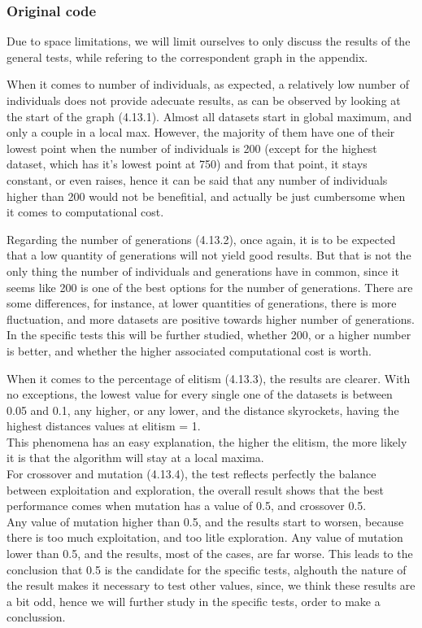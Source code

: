 \subsubsection{Original code}

Due to space limitations, we will limit ourselves to only discuss the results
of the general tests, while refering to the correspondent graph in the
appendix. 

When it comes to number of individuals, as expected, a relatively low number
of individuals does not provide adecuate results, as can be observed by looking
at the start of the graph (4.13.1). Almost all datasets start in global maximum, and only
a couple in a local max. However, the majority of them have one of their
lowest point when the number of individuals is 200 (except for the highest
dataset, which has it's lowest point at 750) and from that point, it stays
constant, or even raises, hence it can be said that any number of individuals higher than 200
would not be benefitial, and actually be just cumbersome when it comes to
computational cost.

Regarding the number of generations (4.13.2), once again, it is to be expected that a
low quantity of generations will not yield good results. But that is not the
only thing the number of individuals and generations have in common, since it
seems like 200 is one of the best options for the number of generations.
There are some differences, for instance, at lower quantities of
generations, there is more fluctuation, and more datasets are positive
towards higher number of generations. In the specific tests this will be
further studied, whether 200, or a higher number is better, and whether the
higher associated computational cost is worth.

When it comes to the percentage of elitism (4.13.3), the results are clearer.
With no exceptions, the lowest value for every single one of the datasets
is between 0.05 and 0.1, any higher, or any lower, and the distance
skyrockets, having the highest distances values at elitism = 1. \\
This phenomena has an easy explanation, the higher the elitism, the more likely it is that the
algorithm will stay at a local maxima. \\

For crossover and mutation (4.13.4), the test reflects perfectly the balance between exploitation and
exploration, the overall result shows that the best performance comes when
mutation has a value of 0.5, and crossover 0.5.\\
Any value of mutation higher than 0.5, and the results start to worsen, because
there is too much exploitation, and too litle exploration. Any value of mutation
lower than 0.5, and the results, most of the cases, are far worse. This leads to
the conclusion that 0.5 is the candidate for the specific tests, alghouth
the nature of the result makes it necessary to test other values, since,
we think these results are a bit odd, hence we will further
study in the specific tests, order to make a conclussion.

